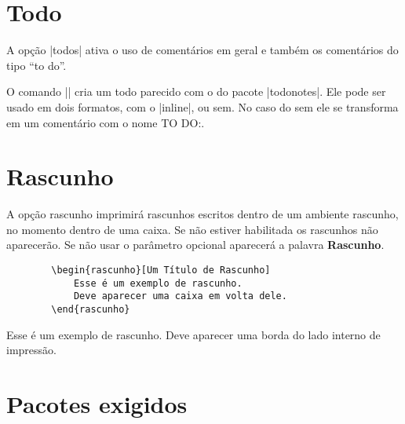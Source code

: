 \documentclass{article}
\begin{document}
    \section{Todo}
    
    A opção |todos| ativa o uso de comentários em geral e também os comentários do tipo ``to do''.
    
    O comando || cria um todo parecido com o do pacote |todonotes|.
    Ele pode ser usado em dois formatos, com o |inline|, ou sem. No caso do sem ele se transforma em um comentário com o nome TO DO:.

    
    
    
    \section{Rascunho}
    
    A opção rascunho imprimirá rascunhos escritos dentro de um ambiente rascunho, no momento dentro de uma caixa. Se não estiver habilitada os rascunhos não aparecerão. Se não usar o parâmetro opcional aparecerá a palavra \textbf{Rascunho}.
    
    \begin{verbatim}
        \begin{rascunho}[Um Título de Rascunho]
            Esse é um exemplo de rascunho.
            Deve aparecer uma caixa em volta dele.
        \end{rascunho}
    \end{verbatim}
    
    \begin{rascunho}
        Esse é um exemplo de rascunho.
        Deve aparecer uma borda do lado interno de impressão.
    \end{rascunho}
    
    \section{Pacotes exigidos}
    
\end{document}
